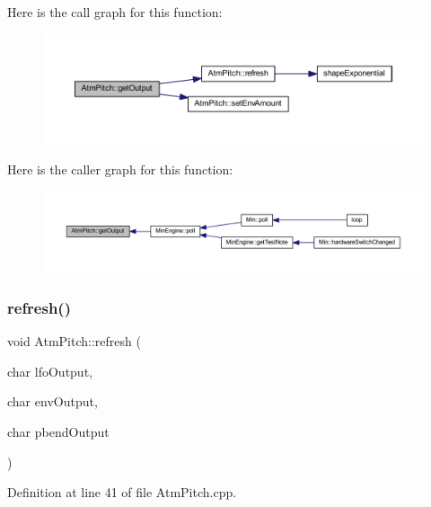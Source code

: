 Here is the call graph for this function\+:
\nopagebreak
\begin{figure}[H]
\begin{center}
\leavevmode
\includegraphics[width=350pt]{dd/d34/class_atm_pitch_a30b8bb597d3f1ce75a0394d2dd510004_cgraph}
\end{center}
\end{figure}
Here is the caller graph for this function\+:
\nopagebreak
\begin{figure}[H]
\begin{center}
\leavevmode
\includegraphics[width=350pt]{dd/d34/class_atm_pitch_a30b8bb597d3f1ce75a0394d2dd510004_icgraph}
\end{center}
\end{figure}
\mbox{\label{class_atm_pitch_a2fc4d9ea4f73818022f9512a656b9572}} 
\subsubsection{\texorpdfstring{refresh()}{refresh()}}
{\footnotesize\ttfamily void Atm\+Pitch\+::refresh (\begin{DoxyParamCaption}\item[{char}]{lfo\+Output,  }\item[{char}]{env\+Output,  }\item[{char}]{pbend\+Output }\end{DoxyParamCaption})}



Definition at line 41 of file Atm\+Pitch.\+cpp.


